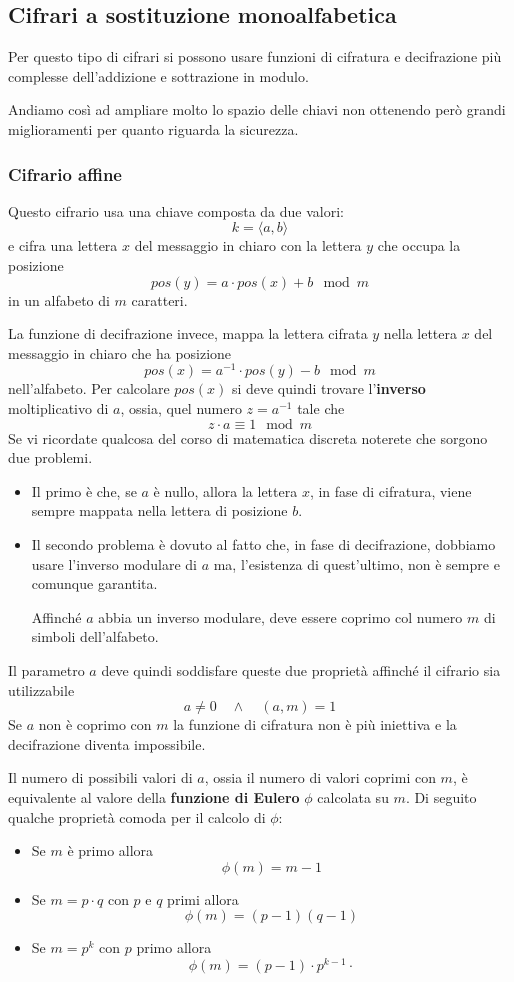 \subsection{Cifrari a sostituzione monoalfabetica}
Per questo tipo di cifrari si possono usare funzioni di cifratura e decifrazione pi\`u complesse dell'addizione e
sottrazione in modulo.

Andiamo cos\`i ad ampliare molto lo spazio delle chiavi non ottenendo per\`o grandi  miglioramenti per quanto
riguarda la sicurezza.

\subsubsection{Cifrario affine}
Questo cifrario usa una chiave composta da due valori:
\[ k = \langle a, b \rangle \]
e cifra una lettera $x$ del messaggio in chiaro con la lettera $y$ che occupa la posizione
\[ pos(y) = a \cdot pos(x) + b \mod{m} \]
in un alfabeto di $m$ caratteri.

La funzione di decifrazione invece, mappa la lettera cifrata $y$ nella lettera $x$ del messaggio in chiaro che ha
posizione
\[ pos(x) = a^{-1} \cdot pos(y) - b \mod{m} \]
nell'alfabeto. Per calcolare $pos(x)$ si deve quindi trovare l'\textbf{inverso} moltiplicativo di $a$, ossia, quel
numero $z = a^{-1}$ tale che
\[ z \cdot a \equiv 1 \mod{m} \]
Se vi ricordate qualcosa del corso di matematica discreta noterete che sorgono due problemi.
\begin{itemize}
	\item Il primo \`e che, se $a$ \`e nullo, allora la lettera $x$, in fase di cifratura, viene sempre mappata nella
	      lettera di posizione $b$.
	\item Il secondo problema \`e dovuto al fatto che, in fase di decifrazione, dobbiamo usare l'inverso modulare di $a$
	      ma, l'esistenza di quest'ultimo, non \`e sempre e comunque garantita.

	      Affinch\'e $a$ abbia un inverso modulare, deve essere coprimo col numero $m$ di simboli dell'alfabeto.
\end{itemize}
Il parametro $a$ deve quindi soddisfare queste due propriet\`a affinch\'e il cifrario sia utilizzabile
\[ a \neq 0 \quad \wedge \quad (a, m) = 1 \]
Se $a$ non \`e coprimo con $m$ la funzione di cifratura non \`e pi\`u iniettiva e la decifrazione diventa impossibile.

Il numero di possibili valori di $a$, ossia il numero di valori coprimi con $m$, \`e equivalente al valore della
\textbf{funzione di Eulero} $\phi$ calcolata su $m$. Di seguito qualche propriet\`a comoda per il calcolo di $\phi$:
\begin{itemize}
	\item Se $m$ \`e primo allora
	      \[ \phi(m) = m - 1 \]
	\item Se $m = p \cdot q$ con $p$ e $q$ primi allora
	      \[ \phi(m) = (p - 1)(q - 1) \]
	\item Se $m = p^{k}$ con $p$ primo allora
	      \[ \phi(m) = (p - 1) \cdot p^{k-1} \cdot  \]
\end{itemize}

